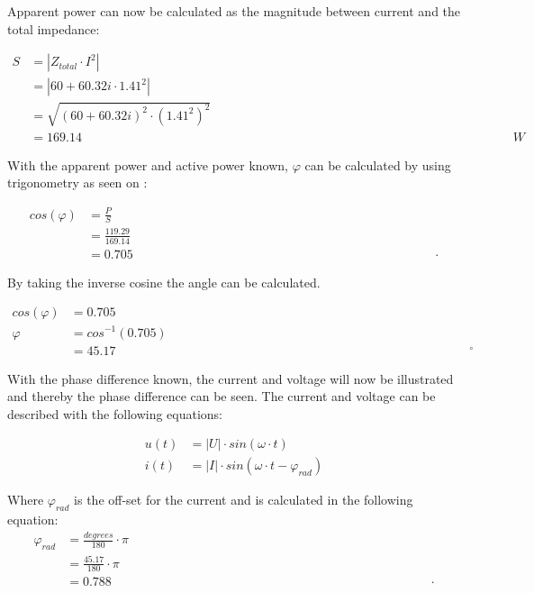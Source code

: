 Apparent power can now be calculated as the magnitude between current and the total impedance:

\begin{align}
S &=|Z_{total} \cdot I^2| \\ \nonumber
  &= |60 + 60.32i\cdot 1.41^2|  \\ \nonumber
  &= \sqrt{(60 + 60.32i)^2\cdot (1.41^2)^2}  \\ \nonumber
  &= 169.14 & & & & & & & & & & & & & & & & & & & & & & & & & & & & & & \unit{W}
\end{align}

With the apparent power and active power known, $\varphi$ can be calculated by using trigonometry as seen on : 

\begin{align}
cos(\varphi) &=\frac{P}{S} \\ \nonumber
  &= \frac{119.29}{169.14}  \\ \nonumber
  &= 0.705 & & & & & & & & & & & & & & & & & & & & & & & & & & & & & & \unit{\cdot}
\end{align}

By taking the inverse cosine the angle can be calculated.

\begin{align}
cos(\varphi) &=0.705 \\ \nonumber
\varphi &=cos^{-1}(0.705) \\ \nonumber
 	 &= 45.17 & & & & & & & & & & & & & & & & & & & & & & & & & & & & & & \unit{^{\circ}}
\end{align}

With the phase difference known, the current and voltage will now be illustrated and thereby the phase difference can be seen. The current and voltage can be described with the following equations: 

\begin{align}
u(t) &=|U|\cdot sin(\omega \cdot t) \\ 
i(t) &=|I|\cdot sin(\omega \cdot t - \varphi_{rad}) 
\end{align}

Where $\varphi_{rad}$ is the off-set for the current and is calculated in the following equation:
\begin{align}\label{eq:varphi}
\varphi_{rad} &= \frac {degrees}{180} \cdot \pi \\ \nonumber
			  &= \frac {45.17}{180} \cdot \pi \\ \nonumber
	 		  &= 0.788 & & & & & & & & & & & & & & & & & & & & & & & & & & & & & & \unit{\cdot}
\end{align}

